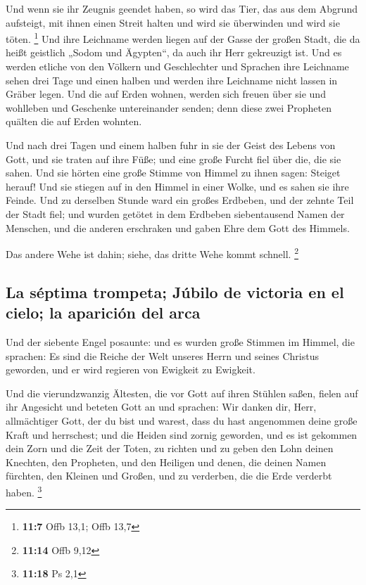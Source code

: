  Und wenn sie ihr Zeugnis geendet haben, so wird das Tier,
das aus dem Abgrund aufsteigt, mit ihnen einen Streit halten und wird
sie überwinden und wird sie töten. \footnote{\textbf{11:7} Offb 13,1;
  Offb 13,7}  Und ihre Leichname werden liegen auf der
Gasse der großen Stadt, die da heißt geistlich „Sodom und Ägypten``, da
auch ihr Herr gekreuzigt ist.  Und es werden etliche von
den Völkern und Geschlechter und Sprachen ihre Leichname sehen drei Tage
und einen halben und werden ihre Leichname nicht lassen in Gräber legen.
 Und die auf Erden wohnen, werden sich freuen über sie
und wohlleben und Geschenke untereinander senden; denn diese zwei
Propheten quälten die auf Erden wohnten.

 Und nach drei Tagen und einem halben fuhr in sie der
Geist des Lebens von Gott, und sie traten auf ihre Füße; und eine große
Furcht fiel über die, die sie sahen.  Und sie hörten eine
große Stimme von Himmel zu ihnen sagen: Steiget herauf! Und sie stiegen
auf in den Himmel in einer Wolke, und es sahen sie ihre Feinde.
 Und zu derselben Stunde ward ein großes Erdbeben, und
der zehnte Teil der Stadt fiel; und wurden getötet in dem Erdbeben
siebentausend Namen der Menschen, und die anderen erschraken und gaben
Ehre dem Gott des Himmels.

 Das andere Wehe ist dahin; siehe, das dritte Wehe kommt
schnell. \footnote{\textbf{11:14} Offb 9,12}

\hypertarget{la-suxe9ptima-trompeta-juxfabilo-de-victoria-en-el-cielo-la-apariciuxf3n-del-arca}{%
\subsection{La séptima trompeta; Júbilo de victoria en el cielo; la
aparición del
arca}\label{la-suxe9ptima-trompeta-juxfabilo-de-victoria-en-el-cielo-la-apariciuxf3n-del-arca}}

 Und der siebente Engel posaunte: und es wurden große
Stimmen im Himmel, die sprachen: Es sind die Reiche der Welt unseres
Herrn und seines Christus geworden, und er wird regieren von Ewigkeit zu
Ewigkeit.

 Und die vierundzwanzig Ältesten, die vor Gott auf ihren
Stühlen saßen, fielen auf ihr Angesicht und beteten Gott an
 und sprachen: Wir danken dir, Herr, allmächtiger Gott,
der du bist und warest, dass du hast angenommen deine große Kraft und
herrschest;  und die Heiden sind zornig geworden, und es
ist gekommen dein Zorn und die Zeit der Toten, zu richten und zu geben
den Lohn deinen Knechten, den Propheten, und den Heiligen und denen, die
deinen Namen fürchten, den Kleinen und Großen, und zu verderben, die die
Erde verderbt haben. \footnote{\textbf{11:18} Ps 2,1}

